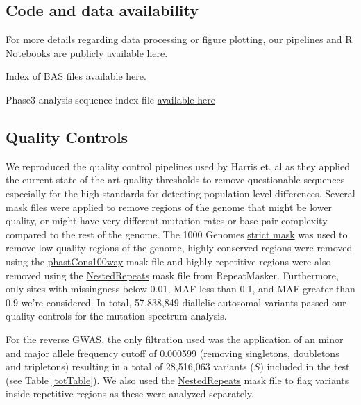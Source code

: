 \documentclass[9pt,lineno]{elife}
\begin{document}
\subsection{Code and data availability}
For more details regarding data processing or figure plotting, our pipelines and R Notebooks are publicly available \href{https://github.com/LukeAndersonTrocme/QualityPaper}{here}.

Index of BAS files \href{http://ftp.1000genomes.ebi.ac.uk/vol1/ftp/data_collections/1000_genomes_project/1000genomes.low_coverage.GRCh38DH.alignment.index}{available here}.

Phase3 analysis sequence index file  \href{http://ftp.1000genomes.ebi.ac.uk/vol1/ftp/phase3/20130502.phase3.analysis.sequence.index}{available here} 

\subsection{Quality Controls}
We reproduced the quality control pipelines used by Harris et. al as they applied the current state of the art quality thresholds to remove questionable sequences especially for the high standards for detecting population level differences. 
Several mask files were applied to remove regions of the genome that might be lower quality, or might have very different mutation rates or base pair complexity compared to the rest of the genome. 
The  1000 Genomes \href{http://ftp.1000genomes.ebi.ac.uk/vol1/ftp/release/20130502/supporting/accessible_genome_masks/20141020.strict_mask.whole_genome.bed}{strict mask} was used to remove low quality regions of the genome, highly conserved regions were removed using the \href{http://hgdownload.cse.ucsc.edu/goldenPath/hg19/database/phastConsElements100way.txt.gz}{phastCons100way} mask file and highly repetitive regions were also removed using the \href{http://hgdownload.cse.ucsc.edu/goldenpath/hg19/database/nestedRepeats.txt.gz}{NestedRepeats} mask file from RepeatMasker. 
Furthermore, only sites with missingness below 0.01, MAF less than 0.1, and MAF greater than 0.9 we're considered.
In total, 57,838,849 diallelic autosomal variants passed our quality controls for the mutation spectrum analysis.

For the reverse GWAS, the only filtration used was the application of an minor and major allele frequency cutoff of 0.000599 (removing singletons, doubletons and tripletons) resulting in a total of 28,516,063 variants ($S$) included in the test (see Table \ref{totTable}). We also used the \href{http://hgdownload.cse.ucsc.edu/goldenpath/hg19/database/nestedRepeats.txt.gz}{NestedRepeats} mask file to flag variants inside repetitive regions as these were analyzed separately.
\end{document}
